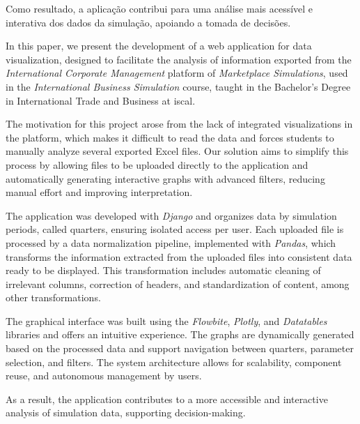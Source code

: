 Como resultado, a aplicação contribui para uma análise mais acessível e interativa dos dados da simulação, apoiando a tomada de decisões.


In this paper, we present the development of a web application for data visualization, designed to facilitate the analysis of information exported from the \textit{International Corporate Management} platform of \textit{Marketplace Simulations}, used in the \textit{International Business Simulation} course, taught in the Bachelor's Degree in International Trade and Business at \gls{iscal}.

The motivation for this project arose from the lack of integrated visualizations in the platform, which makes it difficult to read the data and forces students to manually analyze several exported Excel files. Our solution aims to simplify this process by allowing files to be uploaded directly to the application and automatically generating interactive graphs with advanced filters, reducing manual effort and improving interpretation.

The application was developed with \textit{Django} and organizes data by simulation periods, called quarters, ensuring isolated access per user. Each uploaded file is processed by a data normalization pipeline, implemented with \textit{Pandas}, which transforms the information extracted from the uploaded files into consistent data ready to be displayed. This transformation includes automatic cleaning of irrelevant columns, correction of headers, and standardization of content, among other transformations.

The graphical interface was built using the \textit{Flowbite}, \textit{Plotly}, and \textit{Datatables} libraries and offers an intuitive experience. The graphs are dynamically generated based on the processed data and support navigation between quarters, parameter selection, and filters. The system architecture allows for scalability, component reuse, and autonomous management by users.

As a result, the application contributes to a more accessible and interactive analysis of simulation data, supporting decision-making.
